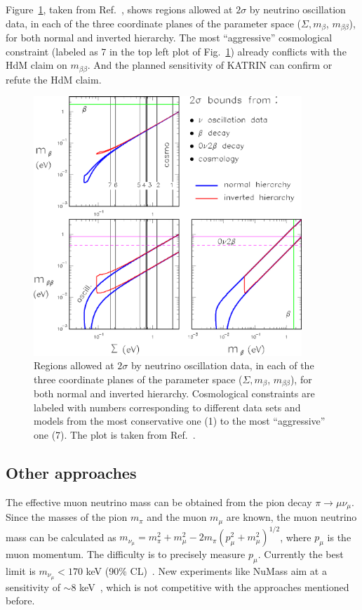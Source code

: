 Figure~\ref{fig:sum1b2b}, taken from Ref.~\cite{Fog07}, shows regions allowed at $2\sigma$ by neutrino oscillation data, in each of the three coordinate planes of the parameter space ($\Sigma, m_{\beta}$, $m_{\beta\beta}$), for both normal and inverted hierarchy. The most ``aggressive'' cosmological constraint (labeled as 7 in the top left plot of Fig.~\ref{fig:sum1b2b}) already conflicts with the HdM claim on $m_{\beta\beta}$. And the planned sensitivity of KATRIN can confirm or refute the HdM claim.
\begin{figure}[tbhp]
  \centering
  \includegraphics[width=0.9\textwidth]{sum1b2b}  
  \caption{Regions allowed at $2\sigma$ by neutrino oscillation data,     in each of the three coordinate planes of the parameter space     ($\Sigma, m_{\beta}$, $m_{\beta\beta}$), for both normal and     inverted hierarchy. Cosmological constraints are labeled with     numbers corresponding to different data sets and models from the     most conservative one (1) to the most ``aggressive'' one (7). The     plot is taken from Ref.~\cite{Fog07}.}
  \label{fig:sum1b2b}
\end{figure}

\subsection{Other approaches}
\label{sec:otap}
The effective muon neutrino mass can be obtained from the pion decay $\pi \rightarrow \mu \nu_{\mu}$. Since the masses of the pion $m_{\pi}$ and the muon $m_{\mu}$ are known, the muon neutrino mass can be calculated as $m_{\nu_{\mu}} = m^{2}_{\pi} + m^{2}_{\mu} - 2m_{\pi} (p^{2}_{\mu} + m^{2}_{\mu})^{1/2}$, where $p_{\mu}$ is the muon momentum. The difficulty is to precisely measure $p_{\mu}$. Currently the best limit is $m_{\nu_{\mu}} < 170$ keV (90\% CL)~\cite{Ass96}. New experiments like NuMass aim at a sensitivity of $\sim 8$ keV~\cite{Num20}, which is not competitive with the approaches mentioned before.

